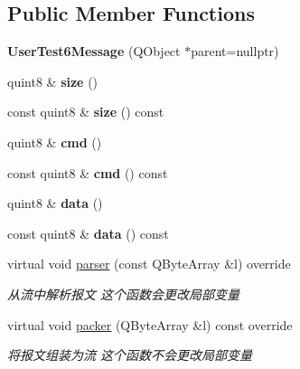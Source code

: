 \subsection*{Public Member Functions}
\begin{DoxyCompactItemize}
\item 
\mbox{\label{class_user_test6_message_a6324e9b0da6de98b56d53dc56fcbe0f9}} 
{\bfseries User\+Test6\+Message} (Q\+Object $\ast$parent=nullptr)
\item 
\mbox{\label{class_user_test6_message_aeed14e1ab7814012d00308fd686fabe2}} 
quint8 \& {\bfseries size} ()
\item 
\mbox{\label{class_user_test6_message_a5f49fc4dcaae76ae0ecb9a85eab5e0bb}} 
const quint8 \& {\bfseries size} () const
\item 
\mbox{\label{class_user_test6_message_a108750e55962564937473f4b621c0f95}} 
quint8 \& {\bfseries cmd} ()
\item 
\mbox{\label{class_user_test6_message_ae6835624cd6f0c76f5b6e1b2c95dab2e}} 
const quint8 \& {\bfseries cmd} () const
\item 
\mbox{\label{class_user_test6_message_a162fdf92c81dea40b107940e232e200a}} 
quint8 \& {\bfseries data} ()
\item 
\mbox{\label{class_user_test6_message_ab6d417c76d371c56df943ea1904a34b5}} 
const quint8 \& {\bfseries data} () const
\item 
virtual void \mbox{\hyperlink{class_user_test6_message_a1b55b1134b2a0ccfc8d5093aa86de694}{parser}} (const Q\+Byte\+Array \&l) override
\begin{DoxyCompactList}\small\item\em 从流中解析报文 这个函数会更改局部变量 \end{DoxyCompactList}\item 
virtual void \mbox{\hyperlink{class_user_test6_message_a9117765e40ea9be61de4d4c3da8528dc}{packer}} (Q\+Byte\+Array \&l) const override
\begin{DoxyCompactList}\small\item\em 将报文组装为流 这个函数不会更改局部变量 \end{DoxyCompactList}\end{DoxyCompactItemize}


